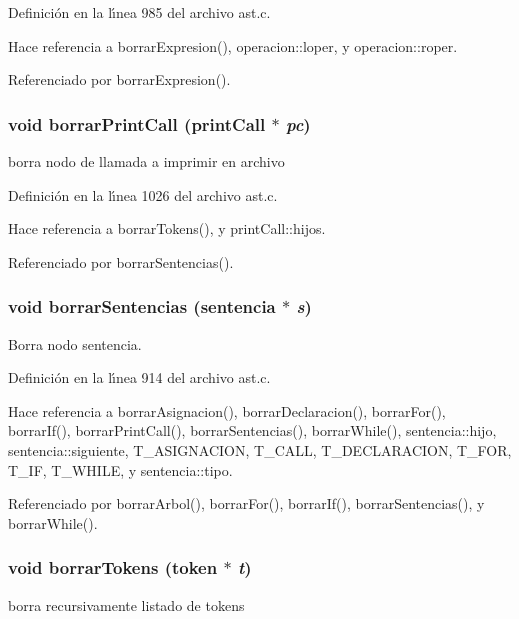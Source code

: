 Definici\'{o}n en la l\'{\i}nea 985 del archivo ast.c.

Hace referencia a borrar\-Expresion(), operacion::loper, y operacion::roper.

Referenciado por borrar\-Expresion().
\subsubsection{\setlength{\rightskip}{0pt plus 5cm}void borrar\-Print\-Call ({\bf print\-Call} $\ast$ {\em pc})}\label{ast_8c_a53}


borra nodo de llamada a imprimir en archivo 



Definici\'{o}n en la l\'{\i}nea 1026 del archivo ast.c.

Hace referencia a borrar\-Tokens(), y print\-Call::hijos.

Referenciado por borrar\-Sentencias().
\subsubsection{\setlength{\rightskip}{0pt plus 5cm}void borrar\-Sentencias ({\bf sentencia} $\ast$ {\em s})}\label{ast_8c_a45}


Borra nodo sentencia. 



Definici\'{o}n en la l\'{\i}nea 914 del archivo ast.c.

Hace referencia a borrar\-Asignacion(), borrar\-Declaracion(), borrar\-For(), borrar\-If(), borrar\-Print\-Call(), borrar\-Sentencias(), borrar\-While(), sentencia::hijo, sentencia::siguiente, T\_\-ASIGNACION, T\_\-CALL, T\_\-DECLARACION, T\_\-FOR, T\_\-IF, T\_\-WHILE, y sentencia::tipo.

Referenciado por borrar\-Arbol(), borrar\-For(), borrar\-If(), borrar\-Sentencias(), y borrar\-While().
\subsubsection{\setlength{\rightskip}{0pt plus 5cm}void borrar\-Tokens ({\bf token} $\ast$ {\em t})}\label{ast_8c_a54}


borra recursivamente listado de tokens 



